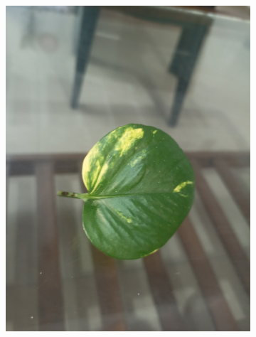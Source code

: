 \documentclass[twocolumn]{article}
\begin{document}
\begin{figure}[H]
    \begin{subfigure}[b]{0.30\columnwidth}
        \includegraphics[width=\textwidth]{money4}
    \end{subfigure}
    \hfill
    \begin{subfigure}[b]{0.30\columnwidth}

\end{subfigure}
\end{figure}
\end{document}
